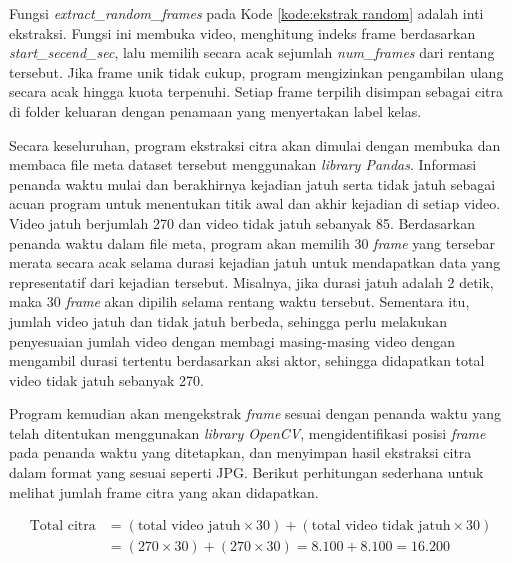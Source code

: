 \vspace{10pt}

Fungsi \textit{extract\_random\_frames} pada Kode \ref{kode:ekstrak random} adalah inti ekstraksi. Fungsi ini membuka video, menghitung indeks frame berdasarkan \textit{start\_sec\–end\_sec}, lalu memilih secara acak sejumlah \textit{num\_frames} dari rentang tersebut. Jika frame unik tidak cukup, program mengizinkan pengambilan ulang secara acak hingga kuota terpenuhi. Setiap frame terpilih disimpan sebagai citra di folder keluaran dengan penamaan yang menyertakan label kelas. \par

Secara keseluruhan, program ekstraksi citra akan dimulai dengan membuka dan membaca file meta dataset tersebut menggunakan \textit{library Pandas}. Informasi penanda waktu mulai dan berakhirnya kejadian jatuh serta tidak jatuh sebagai acuan program untuk menentukan titik awal dan akhir kejadian di setiap video. Video jatuh berjumlah 270 dan video tidak jatuh sebanyak 85. Berdasarkan penanda waktu dalam file meta, program akan memilih 30 \textit{frame} yang tersebar merata secara acak selama durasi kejadian jatuh untuk mendapatkan data yang representatif dari kejadian tersebut. Misalnya, jika durasi jatuh adalah 2 detik, maka 30 \textit{frame} akan dipilih selama rentang waktu tersebut. Sementara itu, jumlah video jatuh dan tidak jatuh berbeda, sehingga perlu melakukan penyesuaian jumlah video dengan membagi masing-masing video dengan mengambil durasi tertentu berdasarkan aksi aktor, sehingga didapatkan total video tidak jatuh sebanyak 270. \par

Program kemudian akan mengekstrak \textit{frame} sesuai dengan penanda waktu yang telah ditentukan menggunakan \textit{library OpenCV}, mengidentifikasi posisi \textit{frame} pada penanda waktu yang ditetapkan, dan menyimpan hasil ekstraksi citra dalam format yang sesuai seperti JPG. Berikut perhitungan sederhana untuk melihat jumlah frame citra yang akan didapatkan. \par

\begin{align*}
    \text{Total citra} &= (\text{total video jatuh} \times 30) +(\text{total video tidak jatuh} \times 30) \label{eq:total citra}\\
    &= (270 \times 30) + (270 \times 30) = 8.100 + 8.100 = 16.200
\end{align*}
\vspace{7pt}

